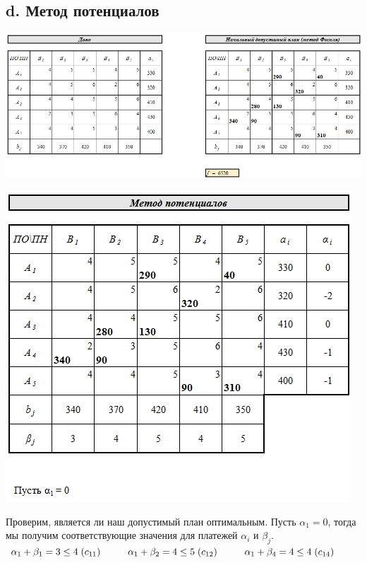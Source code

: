 \documentclass[14pt,a4paper,fleqn]{extarticle}
\begin{document}
\subsection*{d. Метод потенциалов}
\begin{center}
	\includegraphics[scale=0.5]{14}
\end{center}
\begin{center}
	\includegraphics[scale=0.5]{15}
\end{center}
Проверим, является ли наш допустимый план оптимальным. Пусть $\alpha_1 = 0$, тогда мы получим соответствующие значения для платежей $\alpha_i$ и $\beta_j$.\\
$\alpha_1 + \beta_1 = 3 \leq 4 \hspace*{0.1cm} (c_{11}) \hspace*{1cm} \alpha_1 + \beta_2 = 4 \leq 5 \hspace*{0.1cm} (c_{12}) \hspace*{1cm} \alpha_1 + \beta_4 = 4 \leq 4 \hspace*{0.1cm} (c_{14})$\\
\end{document}
